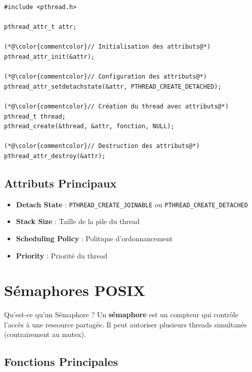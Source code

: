 \documentclass[11pt,a4paper]{article}
\begin{document}
\begin{lstlisting}[caption={Utilisation des attributs}]
#include <pthread.h>

pthread_attr_t attr;

(*@\color{commentcolor}// Initialisation des attributs@*)
pthread_attr_init(&attr);

(*@\color{commentcolor}// Configuration des attributs@*)
pthread_attr_setdetachstate(&attr, PTHREAD_CREATE_DETACHED);

(*@\color{commentcolor}// Création du thread avec attributs@*)
pthread_t thread;
pthread_create(&thread, &attr, fonction, NULL);

(*@\color{commentcolor}// Destruction des attributs@*)
pthread_attr_destroy(&attr);
\end{lstlisting}

\subsection{Attributs Principaux}

\begin{itemize}
    \item \textbf{Detach State} : \texttt{PTHREAD\_CREATE\_JOINABLE} ou \texttt{PTHREAD\_CREATE\_DETACHED}
    \item \textbf{Stack Size} : Taille de la pile du thread
    \item \textbf{Scheduling Policy} : Politique d'ordonnancement
    \item \textbf{Priority} : Priorité du thread
\end{itemize}

\section{Sémaphores POSIX}

\begin{definitionbox}{Qu'est-ce qu'un Sémaphore ?}
Un \textbf{sémaphore} est un compteur qui contrôle l'accès à une ressource partagée. Il peut autoriser plusieurs threads simultanés (contrairement au mutex).
\end{definitionbox}

\subsection{Fonctions Principales}
\end{document}
